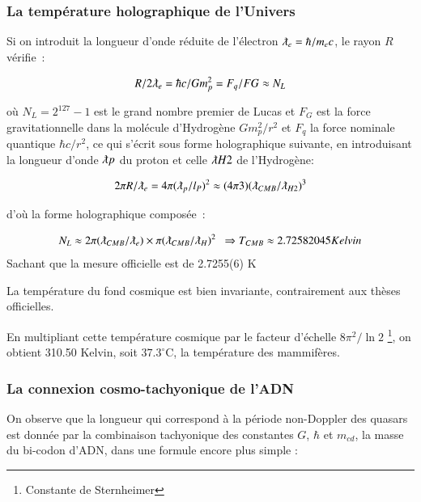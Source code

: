 \documentclass[a4paper,12pt]{article}
\begin{document}
\subsubsection{La température holographique de l'Univers }

     Si on introduit la longueur d'onde réduite de l'électron $\lambdabar_e =  \hbar/m_ec$, le rayon $R$ vérifie :

\begin{equation}
R/2\lambdabar_e = \hbar c/Gm_p^2 = F_q/FG \approx N_L
\end{equation}


où $N_L = 2^{127}-1$ est le grand nombre premier de Lucas et $F_G$ est la force gravitationnelle dans la molécule d'Hydrogène $Gm_p^2/r^2$ et $F_q$ la force nominale quantique $\hbar c/r^2$, ce qui s'écrit sous forme holographique suivante, en introduisant la longueur d'onde $\lambdabar p$ du proton et celle $\lambdabar H2$ de l'Hydrogène:

\begin{equation}
2\pi R/\lambdabar_e = 4\pi (\lambdabar_p /l_P)^2  \approx (4\pi 3) (\lambdabar_{CMB}/\lambdabar_{H2})^3
\end{equation}


d'où la forme holographique composée :

\begin{equation}
N_L \approx 2\pi (\lambdabar_{CMB}/\lambdabar_{e}) \times \pi (\lambdabar_{CMB}/\lambdabar_{H})^2   ~~  \Rightarrow T_{CMB}  \approx 2.72582045  Kelvin
\end{equation}    
Sachant que la mesure officielle est de 2.7255(6) K

La température du fond cosmique est bien invariante, contrairement aux thèses officielles.

En multipliant cette température cosmique par le facteur d'échelle $8 \pi^2/\ln{2}$ \footnote{Constante de Sternheimer}, on obtient 310.50 Kelvin, soit $37.3^{\circ}$C, la température des mammifères.


\subsubsection{La connexion cosmo-tachyonique de l'ADN} 

      On observe que la longueur qui correspond à la période non-Doppler des quasars est donnée par la combinaison tachyonique des constantes $G$,  $\hbar$ et $m_{cd}$, la masse du bi-codon d'ADN, dans une formule encore plus simple :
      
\end{document}
